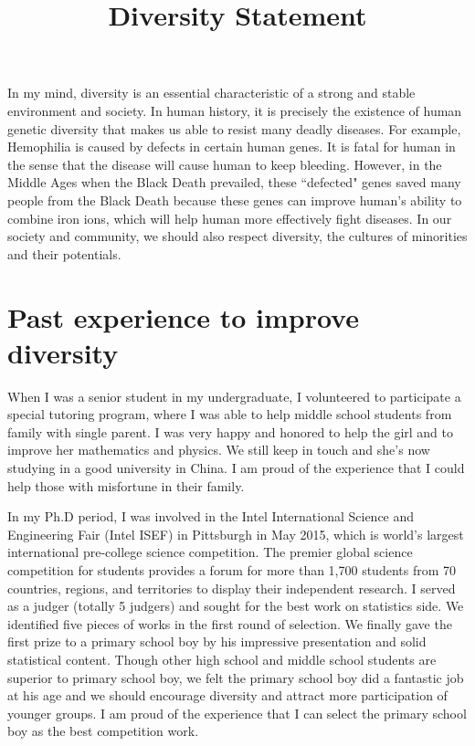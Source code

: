 \documentclass[12pt]{amsart} \usepackage{amssymb}
\title[]{Diversity Statement}
\begin{document}
\maketitle
\thispagestyle{empty}

In my mind,
diversity is an essential characteristic of a strong and stable environment and society.
In human history, it is precisely the existence of human genetic diversity that makes us able to resist many deadly diseases.
For example, Hemophilia is caused by defects in certain human genes.
It is fatal for human in the sense that the disease will cause human to keep bleeding.
However, in the Middle Ages when the Black Death prevailed,
these ``defected" genes saved many people from the Black Death because these genes can improve human's ability to combine iron ions,
which will help human more effectively fight diseases.
In our society and community, we should also respect diversity, the cultures of minorities and their potentials.

\section{Past experience to improve diversity}
When I was a senior student in my undergraduate,
I volunteered to participate a special tutoring program, where I was able to help middle school students from family with single parent.
I was very happy and honored to help the girl and to improve her mathematics and physics.
We still keep in touch and she's now studying in a good university in China.
I am proud of the experience that I could help those with misfortune in their family.

In my Ph.D period,
I was involved in the Intel International Science and Engineering Fair (Intel ISEF)  in Pittsburgh in May 2015,
which is world's largest international pre-college science competition.
The premier global science competition for students provides a forum for more than 1,700 students from 70 countries, 
regions, and territories to display their independent research. 
I served as a judger (totally 5 judgers) and sought for the best work on statistics side.
We identified five pieces of works in the first round of selection.
We finally gave the first prize to a primary school boy by his impressive presentation and solid statistical content.
Though other high school and middle school students are superior to primary school boy,
we felt the primary school boy did a fantastic job at his age and we should encourage diversity and attract more participation of younger groups.
I am proud of the experience that I can select the primary school boy as the best competition work.
\end{document}
